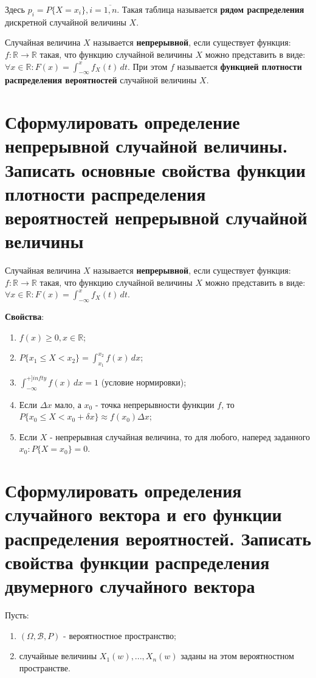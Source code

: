 Здесь $p_i = P\{X=x_i\}, i = \overline{1, n}$. Такая таблица называется \textbf{рядом распределения} дискретной случайной величины $X$.

Случайная величина $X$ называется \textbf{непрерывной}, если существует функция: $f: \mathbb{R} \rightarrow \mathbb{R}$ такая, что функцию случайной величины $X$ можно представить в виде: $\forall x \in \mathbb{R}: F(x) = \int_{-\infty}^{x} f_X(t) \, dt$. При этом $f$ называется \textbf{функцией плотности распределения вероятностей} случайной величины $X$.

\section{Сформулировать определение непрерывной случайной величины. Записать основные свойства функции плотности распределения вероятностей непрерывной случайной величины}

Случайная величина $X$ называется \textbf{непрерывной}, если существует функция: $f: \mathbb{R} \rightarrow \mathbb{R}$ такая, что функцию случайной величины $X$ можно представить в виде: $\forall x \in \mathbb{R}: F(x) = \int_{-\infty}^{x} f_X(t) \, dt$.

\textbf{Свойства}:
\begin{enumerate}
	\item $f(x) \geq 0, x \in \mathbb{R}$;
	\item $P\{x_1 \leq X < x_2\} = \int_{x_1}^{x_2} f(x) \, dx$;
	\item $\int_{-\infty}^{+]infty} f(x) \, dx = 1$ (условие нормировки);
	\item Если $\Delta x$ мало, а $x_0$ - точка непрерывности функции $f$, то $P\{x_0 \leq X < x_0 + \delta x\} \approx f(x_0)\Delta x$;
	\item Если $X$ - непрерывная случайная величина, то для любого, наперед заданного $x_0: P\{X=x_0\} = 0$.
\end{enumerate}

\section{Сформулировать определения случайного вектора и его функции распределения вероятностей. Записать свойства функции распределения двумерного случайного вектора}

Пусть:
\begin{enumerate}
	\item $(\Omega, \mathcal{B}, P)$ - вероятностное пространство;
	\item случайные величины $X_1(w), ..., X_n(w)$ заданы на этом вероятностном пространстве.
\end{enumerate}


